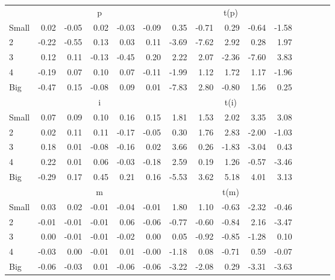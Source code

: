 \begin{table}[!ht]
\begin{tabular}{lrrrrrrrrrrrrrr}
      & \multicolumn{5}{c}{p} & \multicolumn{5}{c}{t(p)}
    
    \\
      \cmidrule(r){2-6} \cmidrule(r){7-11}

    Small   & 0.02  & -0.05  & 0.02  & -0.03  & -0.09  & 0.35  & -0.71  & 0.29  & -0.64  & -1.58  \\
         2  & -0.22  & -0.55  & 0.13  & 0.03  & 0.11  & -3.69  & -7.62  & 2.92  & 0.28  & 1.97  \\
         3  & 0.12  & 0.11  & -0.13  & -0.45  & 0.20  & 2.22  & 2.07  & -2.36  & -7.60  & 3.83  \\
         4  & -0.19  & 0.07  & 0.10  & 0.07  & -0.11  & -1.99  & 1.12  & 1.72  & 1.17  & -1.96  \\
    Big     & -0.47  & 0.15  & -0.08  & 0.09  & 0.01  & -7.83  & 2.80  & -0.80  & 1.56  & 0.25  \\

  
    
      & \multicolumn{5}{c}{i} & \multicolumn{5}{c}{t(i)}
    
    \\
      \cmidrule(r){2-6} \cmidrule(r){7-11}

    Small   & 0.07  & 0.09  & 0.10  & 0.16  & 0.15  & 1.81  & 1.53  & 2.02  & 3.35  & 3.08  \\
         2  & 0.02  & 0.11  & 0.11  & -0.17  & -0.05  & 0.30  & 1.76  & 2.83  & -2.00  & -1.03  \\
         3  & 0.18  & 0.01  & -0.08  & -0.16  & 0.02  & 3.66  & 0.26  & -1.83  & -3.04  & 0.43  \\
         4  & 0.22  & 0.01  & 0.06  & -0.03  & -0.18  & 2.59  & 0.19  & 1.26  & -0.57  & -3.46  \\
    Big     & -0.29  & 0.17  & 0.45  & 0.21  & 0.16  & -5.53  & 3.62  & 5.18  & 4.01  & 3.13  \\

  
    
      & \multicolumn{5}{c}{m} & \multicolumn{5}{c}{t(m)}
    
    \\
      \cmidrule(r){2-6} \cmidrule(r){7-11}

    Small   & 0.03  & 0.02  & -0.01  & -0.04  & -0.01  & 1.80  & 1.10  & -0.63  & -2.32  & -0.46  \\
         2  & -0.01  & -0.01  & -0.01  & 0.06  & -0.06  & -0.77  & -0.60  & -0.84  & 2.16  & -3.47  \\
         3  & 0.00  & -0.01  & -0.01  & -0.02  & 0.00  & 0.05  & -0.92  & -0.85  & -1.28  & 0.10  \\
         4  & -0.03  & 0.00  & -0.01  & 0.01  & -0.00  & -1.18  & 0.08  & -0.71  & 0.59  & -0.07  \\
    Big     & -0.06  & -0.03  & 0.01  & -0.06  & -0.06  & -3.22  & -2.08  & 0.29  & -3.31  & -3.63  \\

  

  \bottomrule
\end{tabular}
\label{tbl:25_Size_NI_F17}
\end{table}